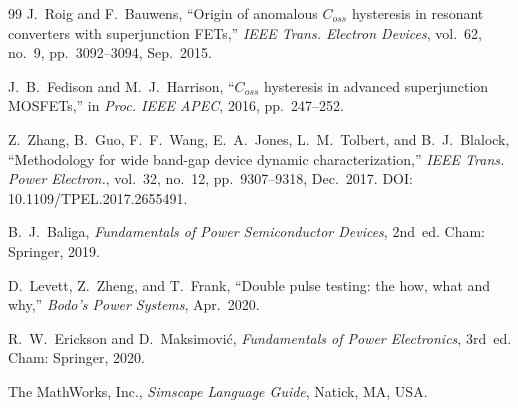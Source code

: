 \documentclass[11pt,a4paper]{article}
\begin{document}
\begin{thebibliography}{99}
 J.~Roig and F.~Bauwens, ``Origin of anomalous $C_{oss}$
hysteresis in resonant converters with superjunction FETs,'' \emph{IEEE Trans.
Electron Devices}, vol.~62, no.~9, pp.~3092--3094, Sep.~2015.

 J.~B.~Fedison and M.~J.~Harrison, ``$C_{oss}$ hysteresis
in advanced superjunction MOSFETs,'' in \emph{Proc. IEEE APEC}, 2016,
pp.~247--252.

 Z.~Zhang, B.~Guo, F.~F.~Wang, E.~A.~Jones, L.~M.~Tolbert,
and B.~J.~Blalock, ``Methodology for wide band-gap device dynamic
characterization,'' \emph{IEEE Trans. Power Electron.}, vol.~32, no.~12,
pp.~9307--9318, Dec.~2017. DOI: 10.1109/TPEL.2017.2655491.

 B.~J.~Baliga, \emph{Fundamentals of Power Semiconductor
Devices}, 2nd~ed. Cham: Springer, 2019.

 D.~Levett, Z.~Zheng, and T.~Frank, ``Double pulse testing:
the how, what and why,'' \emph{Bodo's Power Systems}, Apr.~2020.

 R.~W.~Erickson and D.~Maksimovi\'c, \emph{Fundamentals
of Power Electronics}, 3rd~ed. Cham: Springer, 2020.

 The MathWorks, Inc., \emph{Simscape Language Guide},
Natick, MA, USA.

\end{thebibliography}
\end{document}
